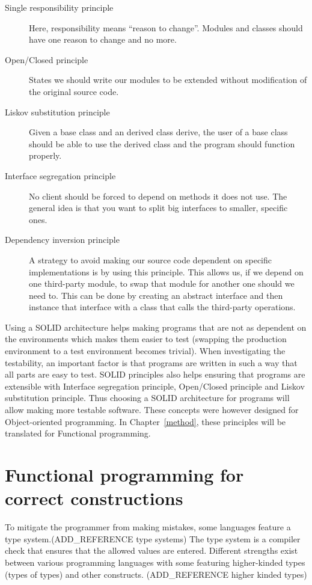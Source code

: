 \begin{description}
    \item [Single responsibility principle] Here, responsibility means ``reason
        to change''. Modules and classes should have one reason to change and no
        more.
    \item [Open/Closed principle] States we should write our modules to be
        extended without modification of the original source code.
    \item [Liskov substitution principle] Given a base class and an derived
        class derive, the user of a base class should be able to use the derived
        class and the program should function properly.
    \item [Interface segregation principle] No client should be forced to depend
        on methods it does not use. The general idea is that you want to split
        big interfaces to smaller, specific ones.
    \item [Dependency inversion principle] A strategy to avoid making our source
        code dependent on specific implementations is by using this principle.
        This allows us, if we depend on one third-party module, to swap that
        module for another one should we need to. This can be done by creating
        an abstract interface and then instance that interface with a class that
        calls the third-party operations.
\end{description}

Using a SOLID architecture helps making programs that are not as dependent on
the environments which makes them easier to test (swapping the production
environment to a test environment becomes trivial). When investigating the
testability, an important factor is that programs are written in such a way
that all parts are easy to test. SOLID principles also helps ensuring that
programs are extensible with Interface segregation principle, Open/Closed
principle and Liskov substitution principle. Thus choosing a SOLID architecture
for programs will allow making more testable software. These concepts were
however designed for Object-oriented programming. In Chapter~\ref{method},
these principles will be translated for Functional programming. 

\section{Functional programming for correct constructions}

To mitigate the programmer from making mistakes, some languages feature a type
system.(ADD\_REFERENCE type systems) The type system is a compiler check that
ensures that the allowed values are entered. Different strengths exist between
various programming languages with some featuring higher-kinded types (types of
types) and other constructs.  (ADD\_REFERENCE higher kinded types)

